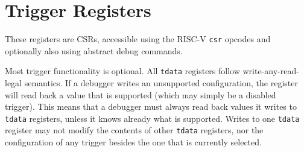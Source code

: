 \section{Trigger Registers}

These registers are CSRs, accessible using the RISC-V {\tt csr} opcodes and
optionally also using abstract debug commands.

Most trigger functionality is optional. All {\tt tdata} registers follow
write-any-read-legal semantics. If a debugger writes an unsupported
configuration, the register will read back a value that is supported (which may
simply be a disabled trigger).  This means that a debugger must always read
back values it writes to {\tt tdata} registers, unless it knows already what is
supported.  Writes to one {\tt tdata} register may not modify the contents of
other {\tt tdata} registers, nor the configuration of any trigger besides the
one that is currently selected.


